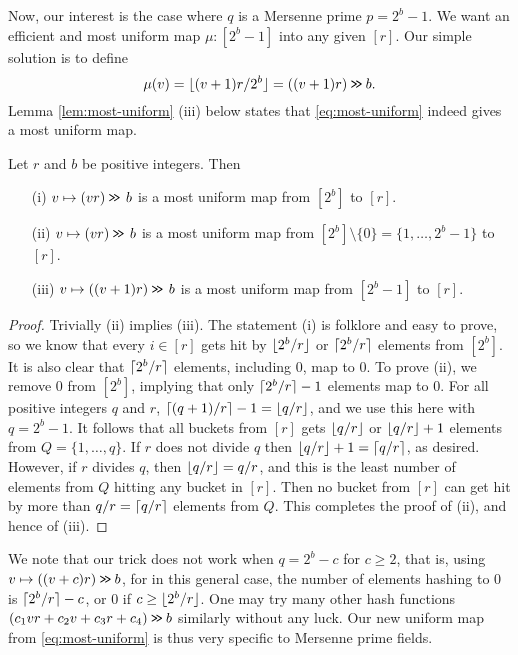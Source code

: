 Now, our interest is the case where $q$ is a Mersenne prime $p=2^b-1$. We want
an efficient and most uniform map $\mu:[2^b-1]$ into any given $[r]$.
Our simple solution is to define
\begin{equation}\label{eq:most-uniform}
	\mu(v)=\lfloor {(v+1)r/2^b} \rfloor=((v+1)r)\mathbin{\texttt{>\!>}} b.
\end{equation}
Lemma \ref{lem:most-uniform} (iii) below
states that \eqref{eq:most-uniform} indeed
gives a most uniform map.
\begin{lemma}\label{lem:most-uniform} Let $r$ and $b$ be positive integers.
	Then
	\begin{itemize}
		\item[(i)] $v\mapsto (vr)\mathbin{\texttt{>\!>}}\,b$ is a most
		      uniform map from $[2^b]$ to $[r]$.
		\item[(ii)] $v\mapsto (vr)\mathbin{\texttt{>\!>}}\,b$ is a most
		      uniform map from $[2^b]\setminus\{0\}=\{1,\ldots,2^b-1\}$ to $[r]$.
		\item[(iii)] $v\mapsto ((v+1)r)\mathbin{\texttt{>\!>}} \, b$ is a most
		      uniform map from $[2^b-1]$ to $[r]$.
	\end{itemize}
\end{lemma}
\begin{proof}
	Trivially (ii) implies (iii).
	The statement (i) is folklore and easy to prove, so we know that every
	$i\in[r]$ gets hit by $\lfloor {2^b/r} \rfloor$ or $\lceil {2^b/r}\rceil$ elements from
	$[2^b]$. It is also clear that $\lceil {2^b/r}\rceil$ elements, including $0$,
	map to $0$. To prove (ii), we remove $0$ from $[2^b]$,
	implying that only
	$\lceil {2^b/r}\rceil-1$ elements map to $0$. For all positive integers $q$
	and $r$, $\lceil {(q+1)/r}\rceil-1=\lfloor {q/r} \rfloor$, and we use this here with
	$q=2^b-1$. It follows that all buckets from $[r]$ gets $\lfloor {q/r} \rfloor$
	or $\lfloor {q/r} \rfloor+1$ elements from $Q=\{1,\ldots,q\}$. If $r$ does
	not divide $q$ then $\lfloor {q/r} \rfloor+1=\lceil {q/r}\rceil$, as desired. However,
	if $r$ divides $q$, then $\lfloor {q/r} \rfloor=q/r$, and this
	is the least number of elements from $Q$ hitting any bucket in $[r]$. Then
	no bucket from $[r]$ can get hit by more than $q/r=\lceil {q/r}\rceil$
	elements from $Q$. This completes the proof of (ii), and hence of (iii).
\end{proof}
We note that our trick does not work when $q=2^b-c$ for $c\geq 2$, that is,
using $v\mapsto ((v+c)r)\mathbin{\texttt{>\!>}}  b$, for in this general case,
the number of elements hashing to $0$ is $\lceil {2^b/r}\rceil-c$, or $0$ if
$c\geq \lfloor {2^b/r} \rfloor$.
One may try many other hash functions $(c_1 v r+ c_2 v+ c_3 r + c_4) \mathbin{\texttt{>\!>}} b$ similarly without any luck.
Our new uniform map from \eqref{eq:most-uniform} is thus very specific to Mersenne prime fields.

